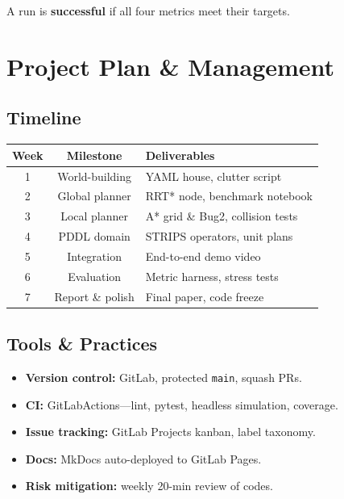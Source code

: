 \documentclass[11pt]{article}
\begin{document}
A run is \textbf{successful} if all four metrics meet their targets.

\section{Project Plan \& Management}

\subsection{Timeline}

\begin{center}
\begin{tabular}{@{}ccl@{}}
\toprule
\textbf{Week} & \textbf{Milestone} & \textbf{Deliverables}\\ \midrule
1 & World-building & YAML house, clutter script\\
2 & Global planner & RRT* node, benchmark notebook\\
3 & Local planner & A* grid \& Bug2, collision tests\\
4 & PDDL domain & STRIPS operators, unit plans\\
5 & Integration & End-to-end demo video\\
6 & Evaluation & Metric harness, stress tests\\
7 & Report \& polish & Final paper, code freeze\\ \bottomrule
\end{tabular}
\end{center}

\subsection{Tools \& Practices}
\begin{itemize}
\item \textbf{Version control:} GitLab, protected \texttt{main}, squash PRs.
\item \textbf{CI:} GitLabActions---lint, pytest, headless simulation, coverage.
\item \textbf{Issue tracking:} GitLab Projects kanban, label taxonomy.
\item \textbf{Docs:} MkDocs auto-deployed to GitLab Pages.
\item \textbf{Risk mitigation:} weekly 20-min review of codes.
\end{itemize}

\end{document}
